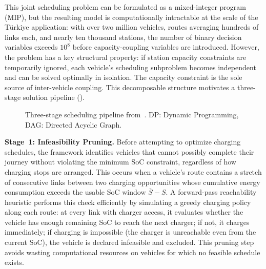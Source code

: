 This joint scheduling problem can be formulated as a mixed-integer program (MIP), but the resulting model is computationally intractable at the scale of the T\"{u}rkiye application: with over two million vehicles, routes averaging hundreds of links each, and nearly ten thousand stations, the number of binary decision variables exceeds $10^8$ before capacity-coupling variables are introduced. However, the problem has a key structural property: if station capacity constraints are temporarily ignored, each vehicle's scheduling subproblem becomes independent and can be solved optimally in isolation. The capacity constraint is the sole source of inter-vehicle coupling. This decomposable structure motivates a three-stage solution pipeline ().

\begin{figure}[!ht]
\centering
{}
\caption{Three-stage scheduling pipeline from~\cite{cokyasar2026electrification}. DP: Dynamic Programming, DAG: Directed Acyclic Graph.}
\label{fig:pipeline}
\end{figure}

\textbf{Stage~1: Infeasibility Pruning.} Before attempting to optimize charging schedules, the framework identifies vehicles that cannot possibly complete their journey without violating the minimum SoC constraint, regardless of how charging stops are arranged. This occurs when a vehicle's route contains a stretch of consecutive links between two charging opportunities whose cumulative energy consumption exceeds the usable SoC window $\overline{S} - \underline{S}$. A forward-pass reachability heuristic performs this check efficiently by simulating a greedy charging policy along each route: at every link with charger access, it evaluates whether the vehicle has enough remaining SoC to reach the next charger; if not, it charges immediately; if charging is impossible (the charger is unreachable even from the current SoC), the vehicle is declared infeasible and excluded. This pruning step avoids wasting computational resources on vehicles for which no feasible schedule exists.


